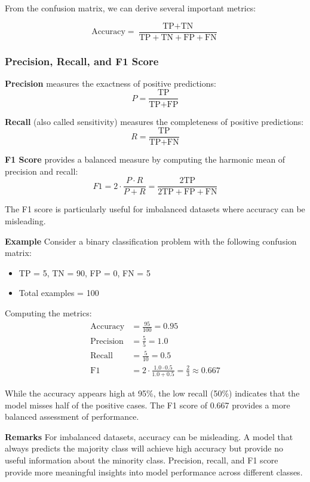 \documentclass[twoside]{article}
\newcommand{\remarks}[1]{\begin{remarksbox} \textbf{Remarks} \newline #1 \end{remarksbox}}
\newcommand{\example}[1]{\begin{examplebox} \textbf{Example} \newline #1 \end{examplebox}}
\numberwithin{equation}{section}
\begin{document}
	From the confusion matrix, we can derive several important metrics:

	\begin{equation}
	\label{eq:Accuracy}
		\boxed{\text{Accuracy} = \frac{\text{TP} + \text{TN}}{\text{TP} + \text{TN} + \text{FP} + \text{FN}}}
	\end{equation}

	\subsubsection{Precision, Recall, and F1 Score}
	\label{subsubsec:PrecisionRecallF1}
	
	\textbf{Precision} measures the exactness of positive predictions:
	\begin{equation}
	\label{eq:Precision}
		\boxed{P = \frac{\text{TP}}{\text{TP} + \text{FP}}}
	\end{equation}

	\textbf{Recall} (also called sensitivity) measures the completeness of positive predictions:
	\begin{equation}
	\label{eq:Recall}
		\boxed{R = \frac{\text{TP}}{\text{TP} + \text{FN}}}
	\end{equation}

	\textbf{F1 Score} provides a balanced measure by computing the harmonic mean of precision and recall:
	\begin{equation}
	\label{eq:F1Score}
		\boxed{F1 = 2 \cdot \frac{P \cdot R}{P + R} = \frac{2\text{TP}}{2\text{TP} + \text{FP} + \text{FN}}}
	\end{equation}

	The F1 score is particularly useful for imbalanced datasets where accuracy can be misleading.

	\example{
		Consider a binary classification problem with the following confusion matrix:
		\begin{itemize}
			\item TP = 5, TN = 90, FP = 0, FN = 5
			\item Total examples = 100
		\end{itemize}

		Computing the metrics:
		\begin{align}
			\text{Accuracy} &= \frac{95}{100} = 0.95 \\
			\text{Precision} &= \frac{5}{5} = 1.0 \\
			\text{Recall} &= \frac{5}{10} = 0.5 \\
			\text{F1} &= 2 \cdot \frac{1.0 \cdot 0.5}{1.0 + 0.5} = \frac{2}{3} \approx 0.667
		\end{align}

		While the accuracy appears high at 95\%, the low recall (50\%) indicates that the model misses half of the positive cases. The F1 score of 0.667 provides a more balanced assessment of performance.
	}

	\remarks{For imbalanced datasets, accuracy can be misleading. A model that always predicts the majority class will achieve high accuracy but provide no useful information about the minority class. Precision, recall, and F1 score provide more meaningful insights into model performance across different classes.}
\end{document}
